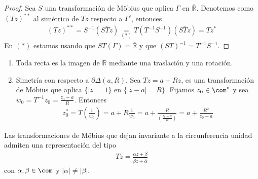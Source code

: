 \begin{proof}
Sea $S$ una transformación de M\"obius que aplica $\Gamma$ en $\overline{\mathbb{R}}$. Denotemos como $(Tz)^{**}$ al simétrico de $Tz$ respecto a $\Gamma'$, entonces
\begin{align*}
    (Tz)^{**} = S^{-1}(\overline{STz}) \underset{(*)}{=} T(T^{-1}S^{-1})(\overline{STz}) = Tz^*
\end{align*}
En $(*)$ estamos usando que $ST(\Gamma) = \overline{\mathbb{R}}$ y que $(ST)^{-1} = T^{-1}S^{-1}$.
\end{proof}

\begin{ejemplo}
\begin{enumerate}
    \item Toda recta es la imagen de $\overline{\mathbb{R}}$ mediante una traslación y una rotación.
    \item Simetría con respecto a $\partial \Delta(a,R)$. Sea $Tz = a + Rz$, es una transformación de M\"obius que aplica $\{ |z| = 1\}$ en $\{ |z-a| = R\}$. Fijamos $z_0 \in \com^*$ y sea $w_0 = T^{-1}z_0 = \frac{z_0 - a}{R}$. Entonces
    \begin{align*}
        z_0^* = T\left( \frac{1}{\overline{w_0}} \right) = a + R\frac{1}{\overline{w_0}} = a + \frac{R}{\overline{\left( \frac{z_0 - a}{R} \right)}} = a + \frac{R^2}{ \overline{z_0 - a}}
    \end{align*}
\end{enumerate}
\end{ejemplo}

\begin{teo}
Las transformaciones de M\"obius que dejan invariante a la circunferencia unidad admiten una representación del tipo
\begin{align*}
    Tz = \frac{\alpha z + \beta}{\overline{\beta}z + \overline{\alpha}}
\end{align*}
con $\alpha,\beta \in \com$ y $|\alpha| \not = |\beta|$.
\end{teo}

